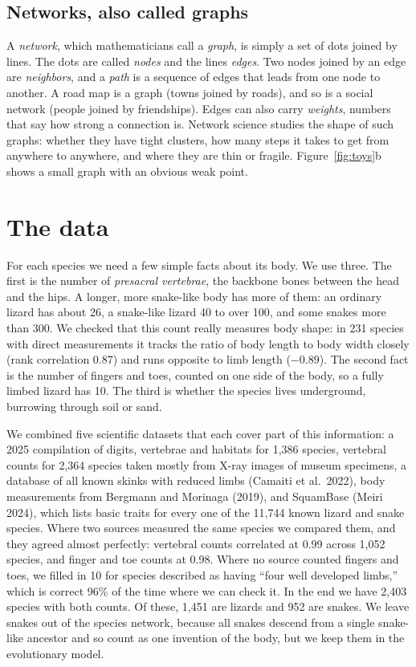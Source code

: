 \documentclass[11pt]{article}
\begin{document}
\subsection{Networks, also called graphs}

A \emph{network}, which mathematicians call a \emph{graph}, is simply a set of dots joined by lines. The dots are called \emph{nodes} and the lines \emph{edges}. Two nodes joined by an edge are \emph{neighbors}, and a \emph{path} is a sequence of edges that leads from one node to another. A road map is a graph (towns joined by roads), and so is a social network (people joined by friendships). Edges can also carry \emph{weights}, numbers that say how strong a connection is. Network science studies the shape of such graphs: whether they have tight clusters, how many steps it takes to get from anywhere to anywhere, and where they are thin or fragile. Figure~\ref{fig:toys}b shows a small graph with an obvious weak point.

\section{The data}

For each species we need a few simple facts about its body. We use three. The first is the number of \emph{presacral vertebrae}, the backbone bones between the head and the hips. A longer, more snake-like body has more of them: an ordinary lizard has about 26, a snake-like lizard 40 to over 100, and some snakes more than 300. We checked that this count really measures body shape: in 231 species with direct measurements it tracks the ratio of body length to body width closely (rank correlation 0.87) and runs opposite to limb length ($-0.89$). The second fact is the number of fingers and toes, counted on one side of the body, so a fully limbed lizard has 10. The third is whether the species lives underground, burrowing through soil or sand.

We combined five scientific datasets that each cover part of this information: a 2025 compilation of digits, vertebrae and habitats for 1,386 species, vertebral counts for 2,364 species taken mostly from X-ray images of museum specimens, a database of all known skinks with reduced limbs (Camaiti et al.\ 2022), body measurements from Bergmann and Morinaga (2019), and SquamBase (Meiri 2024), which lists basic traits for every one of the 11,744 known lizard and snake species. Where two sources measured the same species we compared them, and they agreed almost perfectly: vertebral counts correlated at 0.99 across 1,052 species, and finger and toe counts at 0.98. Where no source counted fingers and toes, we filled in 10 for species described as having ``four well developed limbs,'' which is correct 96\% of the time where we can check it. In the end we have 2,403 species with both counts. Of these, 1,451 are lizards and 952 are snakes. We leave snakes out of the species network, because all snakes descend from a single snake-like ancestor and so count as one invention of the body, but we keep them in the evolutionary model.
\end{document}

